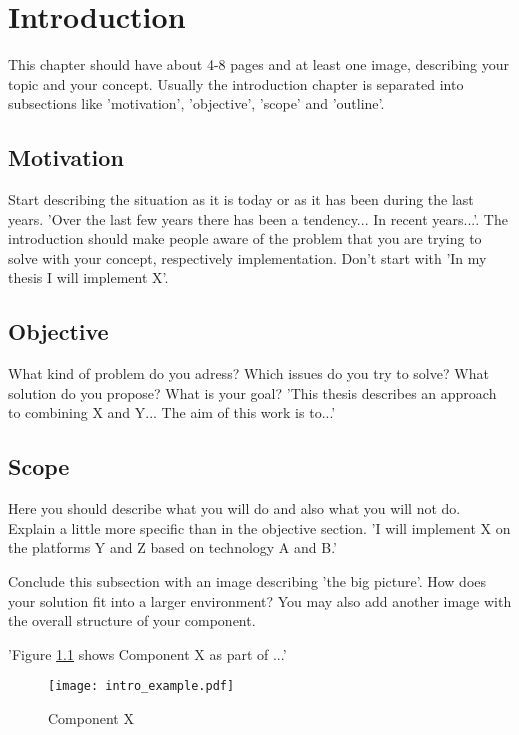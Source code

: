 \chapter{Introduction\label{cha:chapter1}}

This chapter should have about 4-8 pages and at least one image, describing your topic and your concept. Usually the introduction chapter is separated into subsections like 'motivation', 'objective', 'scope' and 'outline'.

\section{Motivation\label{sec:moti}}

Start describing the situation as it is today or as it has been during the last years. 'Over the last few years there has been a tendency... In recent years...'. The introduction should make people aware of the problem that you are trying to solve with your concept, respectively implementation. Don't start with 'In my thesis I will implement X'.

\section{Objective\label{sec:objective}}

What kind of problem do you adress? Which issues do you try to solve? What solution do you propose? What is your goal?
'This thesis describes an approach to combining X and Y... The aim of this work is to...'

\section{Scope\label{sec:scope}}

Here you should describe what you will do and also what you will not do. Explain a little more specific than in the objective section. 'I will implement X on the platforms Y and Z based on technology A and B.'

Conclude this subsection with an image describing 'the big picture'. How does your solution fit into a larger environment? You may also add another image with the overall structure of your component.

'Figure \ref{fig:intro} shows Component X as part of ...' 
\\
\begin{figure}[htb]
  \centering
  \texttt{[image: intro\_example.pdf]}\\
  \caption{Component X}\label{fig:intro}
\end{figure}

